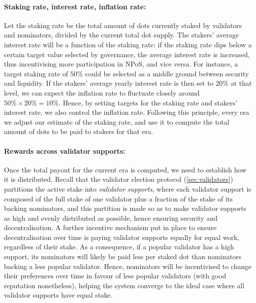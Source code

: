 \paragraph{Staking rate, interest rate, inflation rate:} Let the staking rate be the total amount of dots 
currently staked by validators and nominators, divided by the current total dot supply. 
The stakers' average interest rate will be a function of the staking rate: 
if the staking rate dips below a certain target value selected by governance, 
the average interest rate is increased, thus incentivising more participation in NPoS, and vice versa. 
For instance, a target staking rate of $50\%$ could be selected as a middle ground between security and liquidity. 
If the stakers' average yearly interest rate is then set to $20\%$ at that level, 
we can expect the inflation rate to fluctuate closely around $50\%\times 20\% = 10\%$. 
Hence, by setting targets for the staking rate and stakers' interest rate, we also control the inflation rate. 
Following this principle, every era we adjust our estimate of the staking rate, 
and use it to compute the total amount of dots to be paid to stakers for that era.

\paragraph{Rewards across validator supports:} 
Once the total payout for the current era is computed, we need to establish how it is distributed.
Recall that the validator election protocol (\autoref{sec:validators}) partitions the active stake into 
\emph{validator supports}, where each validator support is composed of the full stake of one validator 
plus a fraction of the stake of its backing nominators, and this partition is made so as to make validator supports 
as high and evenly distributed as possible, hence ensuring security and decentralisation. 
A further incentive mechanism put in place to ensure decentralisation over time 
is paying validator supports equally for equal work, regardless of their stake. 
As a consequence, if a popular validator has a high support, its nominators will likely be paid less per staked dot 
than nominators backing a less popular validator. Hence, nominators will be incentivised to change their preferences 
over time in favour of less popular validators (with good reputation nonetheless), helping the system converge to the ideal case where all validator supports have equal stake.

